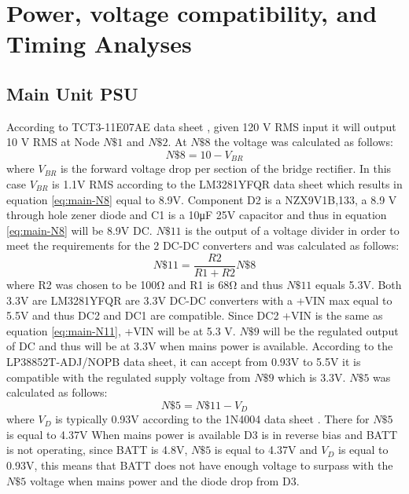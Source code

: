 \section{Power, voltage compatibility, and Timing Analyses}
\subsection{Main Unit PSU}
According to TCT3-11E07AE data sheet \cite{TCT311E07AETriadMagnetics}, given 120 V RMS input it will output 10 V RMS at Node $N\$1$ and $N\$2$. At $N\$8$ the voltage was calculated as follows:
\begin{equation}
  N\$8 = 10 - V_{BR}
  \label{eq:main-N8}
\end{equation}
where $V_{BR}$ is the forward voltage drop per section of the bridge rectifier. In this case $V_{BR}$ is \num{1.1}\si{\V} RMS according to the LM3281YFQR data sheet \cite{LM3281YFQR} which results in equation \ref{eq:main-N8} equal to 8.9\si{\V}. Component D2 is a NZX9V1B,133, a 8.9 V through hole zener diode and C1 is a 10\si{\micro\farad} 25V capacitor and thus in equation \ref{eq:main-N8} will be 8.9\si{\V} DC. $N\$11$ is the output of a voltage divider in order to meet the requirements for the 2 DC-DC converters and was calculated as follows:
\begin{equation}
  N\$11 = \frac{R2}{R1+R2}N\$8
  \label{eq:main-N11}
\end{equation}
where R2 was chosen to be 100\si{\ohm} and R1 is 68\si{\ohm} and thus $N\$11$ equals 5.3\si{\V}. Both 3.3\si{\V} are LM3281YFQR \cite{LM3281YFQR} are 3.3\si{\V} DC-DC converters with a +VIN max equal to 5.5\si{\V} and thus DC2 and DC1 are compatible. Since DC2 +VIN is the same as equation \ref{eq:main-N11}, +VIN will be at 5.3 V. $N\$9$ will be the regulated output of DC and thus will be at 3.3V when mains power is available. According to the LP38852T-ADJ/NOPB data sheet, \cite{LP38852TADJNOPB} it can accept from 0.93\si{\V} to 5.5\si{\V} it is compatible with the regulated supply voltage from $N\$9$ which is 3.3\si{\V}. $N\$5$ was calculated as follows:
\begin{equation}
  N\$5 =  N\$11 - V_{D}
  \label{eq:main-N5}
\end{equation}
where $V_{D}$ is typically 0.93\si{\V} according to the 1N4004 data sheet \cite{1N4004RLG}. There for $N\$5$ is equal to 4.37\si{\V}
When mains power is available D3 is in reverse bias and BATT is not operating, since BATT is 4.8\si{\V}, $N\$5$ is equal to 4.37\si{\V} and $V_{D}$ is equal to 0.93\si{\V}, this means that BATT does not have enough voltage to surpass with the $N\$5$ voltage when mains power and the diode drop from D3.
